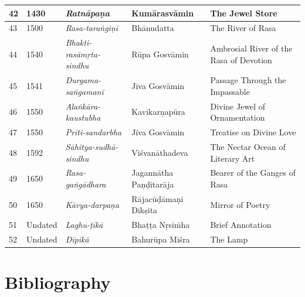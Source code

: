 \begin{longtable}{|l|p{1.1cm}|p{1.98cm}|p{1.98cm}|p{1.98cm}|}
\hline
42 & 1430 & \textit{Ratnāpaṇa}\index{Ratnapana@\textit{Ratnāpaṇa}} & Kumārasvāmin\index{Kumarasvamin@Kumārasvāmin} & The Jewel Store \\
\hline
43 & 1500 & \textit{Rasa-taraṅgiṇī}\index{Rasatarangini@\textit{Rasa-taraṅgiṇī}} & Bhānudatta\index{Bhanudatta@Bhānudatta} & The River of Rasa \\
\hline
44 & 1540 & \textit{Bhakti-rasāmṛta-sindhu}\index{Bhaktirasamrtasindhu@\textit{Bhakti-rasāmṛta-sindhu}} & Rūpa Gosvāmin\index{Rupa Gosvamin@Rūpa Gosvāmin} & Ambrosial River of the Rasa of Devotion \\
\hline
45 & 1541 & \textit{Durgama-saṅgamanī}\index{Durgamasangamani@\textit{Durgama-saṅgamanī}} & Jīva Gosvāmin\index{Jiva Gosvamin@Jīva Gosvāmin} & Passage Through the Impassable \\
\hline
46 & 1550 & \textit{Alaṅkāra-kaustubha}\index{Alankarakaustubha@\textit{Alaṅkāra-kaustubha}} & Kavikarṇapūra\index{Kavikarnapura@Kavikarṇapūra} & Divine Jewel of Ornamentation \\
\hline
47 & 1550 & \textit{Prīti-sandarbha}\index{Pritisandarbha@\textit{Prīti-sandarbha}} & Jīva Gosvāmin & Treatise on Divine Love \\
\hline
48 & 1592 & \textit{Sāhitya-sudhā-sindhu}\index{Sahityasudhasindhu@\textit{Sāhityasudhā-sindhu}} & Viśvanātha\-deva & The Nectar Ocean of Literary Art \\
\hline
49 & 1650 & \textit{Rasa-gaṅgādhara}\index{Rasagangadhara@\textit{Rasa-gaṅgādhara}} & Jagannātha Paṇḍitarāja\index{Jagannatha Panditaraja@Jagannātha Paṇḍitarāja} & Bearer of the Ganges of Rasa \\
\hline
50 & 1650 & \textit{Kāvya-darpaṇa}\index{Kavyadarpana@\textit{Kāvya-darpaṇa}} & Rājacūḍāmaṇi Dīkṣita\index{Rajacudamani Diksita@Rājacūḍāmaṇi Dīkṣita} & Mirror of Poetry \\
\hline
51 & Undated & \textit{Laghu-ṭīkā}\index{Laghutika@\textit{Laghu-ṭīkā}} & Bhaṭṭa Nṛsiṁha\index{Bhatta Nrsimha@Bhaṭṭa Nṛsiṁha} & Brief Annotation \\
\hline
52 & Undated & \textit{Dīpikā}\index{Dipika@\textit{Dīpikā}} & Bahurūpa Miśra\index{Bahurupa Misra@Bahurūpa Miśra} & The Lamp \\
\hline
\end{longtable}


\section*{Bibliography}

